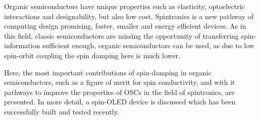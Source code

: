 
Organic semiconductors have unique properties such as elasticity, optoelectric interactions and designability,
but also low cost. Spintronics is a new pathway of computing design promising, faster, smaller and energy efficient devices.
As in this field, classic semiconductors are missing the opportunity of transferring spin-information sufficient enough, organic semiconductors can be used,
as due to low spin-orbit coupling the spin damping here is much lower.

Here, the most important contributions of spin-damping in organic semiconductors, such as a figure of merit for spin conductivity, and with it pathways to improve the properties of OSCs in the field of spintronics, are presented.
In more detail, a spin-OLED device is discussed which has been successfully built and tested recently.